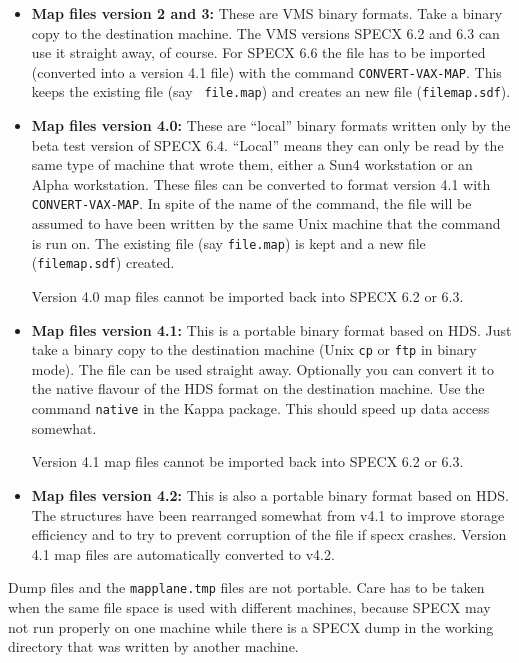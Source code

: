 \documentclass[twoside,11pt]{article}
\renewcommand{\_}{\texttt{\symbol{95}}}
\begin{document}
\begin{itemize}
\item {\bf Map files version 2 and 3:}
    These are VMS binary formats. Take a binary
    copy to the destination machine. The VMS versions SPECX 6.2 and 6.3
    can use it straight away, of course. For SPECX 6.6 the file has to
    be imported (converted into a version 4.1 file) with the command
    {\tt CONVERT-VAX-MAP}. This keeps the existing file (say {\tt
    file.map}) and creates an new file ({\tt file\_map.sdf}).

\item {\bf Map files version 4.0:}
    These are ``local'' binary formats written only by
    the beta test version of SPECX 6.4. ``Local'' means they can only be
    read by the same type of machine that wrote them, either a Sun4
    workstation or an Alpha workstation. These files can be converted to
    format version 4.1 with {\tt CONVERT-VAX-MAP}. In spite of the name of the
    command, the file will be assumed to have been written by the same
    Unix machine that the command is run on. The existing file (say
    {\tt file.map}) is kept and a new file ({\tt file\_map.sdf}) created.

    Version 4.0 map files cannot be imported back into SPECX 6.2 or 6.3.

\item {\bf Map files version 4.1:}
    This is a portable binary format based on HDS.
    Just take a binary copy to the destination machine (Unix {\tt cp} or
    {\tt ftp} in binary mode). The file can be used straight away.
    Optionally you can convert it to the native flavour of the HDS
    format on the destination machine. Use the command {\tt native} in the
    Kappa package. This should speed up data access somewhat.

    Version 4.1 map files cannot be imported back into SPECX 6.2 or 6.3.

\item {\bf Map files version 4.2:}
    This is also a portable binary format based on HDS. The structures
have been rearranged somewhat from v4.1 to improve storage efficiency
and to try to prevent corruption of the file if specx crashes. Version
4.1 map files are automatically converted to v4.2.

\end{itemize}

Dump files and the {\tt mapplane.tmp} files are not portable. Care has to
be taken when the same file space is used with different machines,
because SPECX may not run properly on one machine while there is a SPECX
dump in the working directory that was written by another machine.
\end{document}
